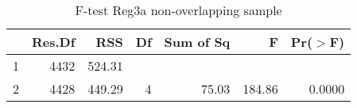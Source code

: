 \begin{table}[ht]
\centering
\caption{F-test Reg3a non-overlapping sample} 
\begin{tabular}{lrrrrrr}
  \hline
 & Res.Df & RSS & Df & Sum of Sq & F & Pr($>$F) \\ 
  \hline
1 & 4432 & 524.31 &  &  &  &  \\ 
  2 & 4428 & 449.29 & 4 & 75.03 & 184.86 & 0.0000 \\ 
   \hline
\end{tabular}
\end{table}
